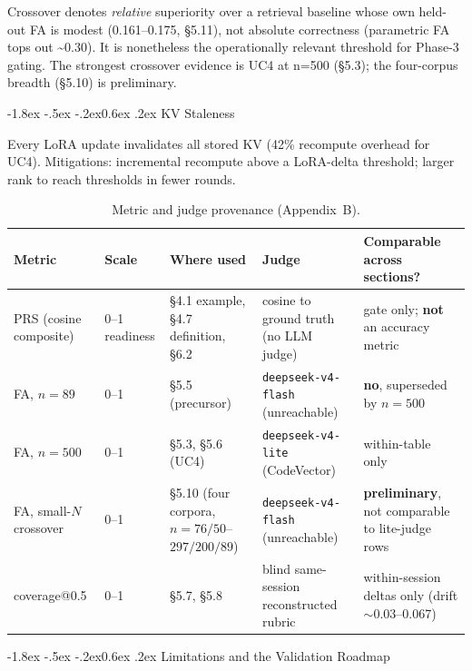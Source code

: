 \documentclass[10pt,twocolumn]{article}
\makeatletter
\renewcommand\subsection{\@startsection{subsection}{2}{\z@}%
  {-1.8ex \@plus -.5ex \@minus -.2ex}{0.6ex \@plus .2ex}%
  {\normalfont\normalsize\bfseries}}
\makeatother
\begin{document}
Crossover denotes \emph{relative} superiority over a retrieval baseline whose own held-out FA is modest (0.161--0.175, §5.11), not absolute correctness (parametric FA tops out \textasciitilde0.30). It is nonetheless the operationally relevant threshold for Phase-3 gating. The strongest crossover evidence is UC4 at n=500 (§5.3); the four-corpus breadth (§5.10) is preliminary.

\hypertarget{kv-staleness}{%
\subsection{KV Staleness}\label{kv-staleness}}

Every LoRA update invalidates all stored KV (42\% recompute overhead for UC4). Mitigations: incremental recompute above a LoRA-delta threshold; larger rank to reach thresholds in fewer rounds.

\begin{table}[!t]
\centering
\caption{Metric and judge provenance (Appendix~B).}
\label{tab:provenance}
\small
\begin{tabularx}{\textwidth}{@{}L l L L L@{}}
\toprule
Metric & Scale & Where used & Judge & Comparable across sections? \\
\midrule
PRS (cosine composite) & 0--1 readiness & \S4.1 example, \S4.7 definition, \S6.2 & cosine to ground truth (no LLM judge) & gate only; \textbf{not} an accuracy metric \\
FA, $n{=}89$ & 0--1 & \S5.5 (precursor) & \texttt{deepseek-v4-flash} (unreachable) & \textbf{no}, superseded by $n{=}500$ \\
FA, $n{=}500$ & 0--1 & \S5.3, \S5.6 (UC4) & \texttt{deepseek-v4-lite} (CodeVector) & within-table only \\
FA, small-$N$ crossover & 0--1 & \S5.10 (four corpora, $n{=}76/50$--$297/200/89$) & \texttt{deepseek-v4-flash} (unreachable) & \textbf{preliminary}, not comparable to lite-judge rows \\
coverage@0.5 & 0--1 & \S5.7, \S5.8 & blind same-session reconstructed rubric & within-session deltas only (drift $\sim$0.03--0.067) \\
\bottomrule
\end{tabularx}
\end{table}

\hypertarget{limitations-and-the-validation-roadmap}{%
\subsection{Limitations and the Validation Roadmap}\label{limitations-and-the-validation-roadmap}}
\end{document}

